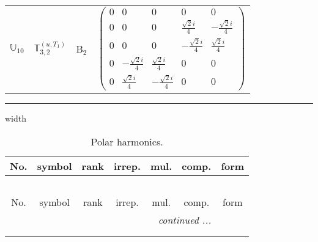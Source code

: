 \documentclass[fleqn,10pt,landscape]{article}
\begin{document}
\begin{itemize}
\begin{center}
\begin{longtable}{c|c|c|c}
$ \mathbb{U}_{10} $ & $\mathbb{T}_{3,2}^{(u,T_{1})}$ & B$_{2}$ & $\begin{pmatrix} 0 & 0 & 0 & 0 & 0 \\ 0 & 0 & 0 & \frac{\sqrt{2} i}{4} & - \frac{\sqrt{2} i}{4} \\ 0 & 0 & 0 & - \frac{\sqrt{2} i}{4} & \frac{\sqrt{2} i}{4} \\ 0 & - \frac{\sqrt{2} i}{4} & \frac{\sqrt{2} i}{4} & 0 & 0 \\ 0 & \frac{\sqrt{2} i}{4} & - \frac{\sqrt{2} i}{4} & 0 & 0 \end{pmatrix}$ \\
\end{longtable}
\end{center}

 \hfil \hrule height 1mm width \textwidth \hfil

\begin{center}
\renewcommand{\arraystretch}{1.3}
\begin{longtable}{ccccccc}
\caption{Polar harmonics.}
 \\
 \hline \hline
No. & symbol & rank & irrep. & mul. & comp. & form \\ \hline \endfirsthead

\multicolumn{6}{l}{\tablename\ \thetable{}} \\
 \hline \hline
No. & symbol & rank & irrep. & mul. & comp. & form \\ \hline \endhead

 \hline \hline
\multicolumn{6}{r}{\footnotesize\it continued ...} \\ \endfoot

 \hline \hline
\multicolumn{6}{r}{} \\ \endlastfoot


\end{longtable}
\end{center}
\end{itemize}
\end{document}
